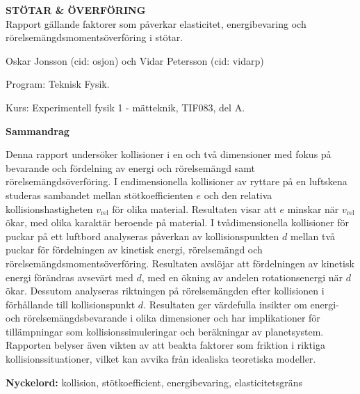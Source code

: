 \begin{center}
    \vspace*{0.8cm}
    {\huge\bf STÖTAR \& ÖVERFÖRING}\\
    \vspace{0.5cm}
    \large{Rapport gällande faktorer som påverkar elasticitet, energibevaring och rörelsemängdsmomentsöverföring i stötar.}\\
\end{center}
\vspace{1.0cm}

\begin{center}
Oskar Jonsson (cid: osjon) och Vidar Petersson (cid: vidarp)

Program: Teknisk Fysik. 

Kurs: Experimentell fysik 1 - mätteknik, TIF083, del A.
\end{center}
\vspace{1.0cm}

\centerline{\bf Sammandrag}
\noindent Denna rapport undersöker kollisioner i en och två dimensioner med fokus på bevarande och fördelning av energi och rörelsemängd samt rörelsemängdsöverföring. I endimensionella kollisioner av ryttare på en luftskena studeras sambandet mellan stötkoefficienten $e$ och den relativa kollisionshastigheten $v_{\text{rel}}$ för olika material. Resultaten visar att $e$ minskar när $v_{\text{rel}}$ ökar, med olika karaktär beroende på material. I tvådimensionella kollisioner för puckar på ett luftbord analyseras påverkan av kollisionspunkten $d$ mellan två puckar för fördelningen av kinetisk energi, rörelsemängd och rörelsemängdsmomentsöverföring. Resultaten avslöjar att fördelningen av kinetisk energi förändras avsevärt med $d$, med en ökning av andelen rotationsenergi när $d$ ökar. Dessutom analyseras riktningen på rörelsemängden efter kollisionen i förhållande till kollisionspunkt $d$. Resultaten ger värdefulla insikter om energi- och rörelsemängdsbevarande i olika dimensioner och har implikationer för tillämpningar som kollisionssimuleringar och beräkningar av planetsystem. Rapporten belyser även vikten av att beakta faktorer som friktion i riktiga kollisionssituationer, vilket kan avvika från idealiska teoretiska modeller.

{\bf Nyckelord:} kollision, stötkoefficient, energibevaring, elasticitetsgräns


